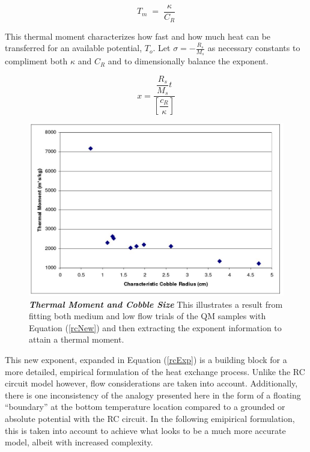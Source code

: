 \begin{equation}\label{tm}
T_m\;=\;\dfrac{\kappa}{C_R}
\end{equation}

This thermal moment characterizes how fast and how much heat can be transferred for an available potential, $T_{o}$. Let $\sigma=-\frac{R_{s}}{M_{s}}$ as necessary constants to compliment both $\kappa$ and $C_{R}$ and to dimensionally balance the exponent. 

\begin{equation}\label{rcExp}
x=\frac{\dfrac{R_{s}}{M_{s}} t}{\left[\dfrac{c_{R}}{\kappa}\right]}
\end{equation}

\begin{figure}[h!]
\begin{center}
\includegraphics[scale=.4]{thMom.jpg}
\caption[Thermal Moment and Cobble Size]{\textbf{\emph{Thermal Moment and Cobble Size}} This illustrates a result from fitting both medium and low flow trials of the QM samples with Equation (\ref{rcNew}) and then extracting the exponent information to attain a thermal moment.\label{thMom}}
\end{center}
\end{figure}
\pagebreak
This new exponent, expanded in Equation (\ref{rcExp}) is a building block for a more detailed, empirical formulation of the heat exchange process. Unlike the RC circuit model however, flow considerations are taken into account. Additionally, there is one inconsistency of the analogy presented here  in the form of a floating ``boundary'' at the bottom temperature location compared to a grounded or absolute potential with the RC circuit. In the following emipirical formulation, this is taken into account to achieve what looks to be a much more accurate model, albeit with increased complexity.

